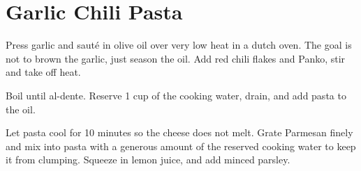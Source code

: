 \section{Garlic Chili Pasta}
\begin{recipe}



Press garlic and sauté in olive oil over very low heat in a dutch oven. The goal is not to brown the garlic, just season the oil.  Add red chili flakes and Panko, stir and take off heat.


Boil until al-dente. Reserve 1 cup of the cooking water, drain, and add pasta to the oil.



Let pasta cool for 10 minutes so the cheese does not melt.
Grate Parmesan finely and mix into pasta with a generous amount of the reserved cooking water to keep it from clumping.
Squeeze in lemon juice, and add minced parsley.

\end{recipe}
